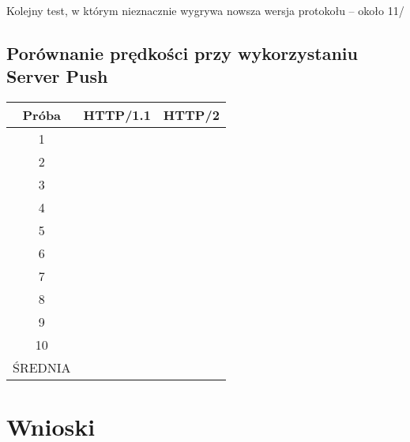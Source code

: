 \documentclass[a4paper,12pt,twoside,openany]{report}
\newcommand{\tech}{\texttt}
\begin{document}
Kolejny test, w którym nieznacznie wygrywa nowsza wersja protokołu -- około 11/%

\section{Porównanie prędkości przy wykorzystaniu Server Push}

\begin{tabular}{c|c|c}
Próba & HTTP/1.1 & HTTP/2 \\ \hline
1 & & \\
2 & & \\
3 & & \\
4 & & \\
5 & & \\
6 & & \\
7 & & \\
8 & & \\
9 & & \\
10 & & \\ \hline
ŚREDNIA & & \\
\end{tabular}


\chapter{Wnioski}


%
%



\begin{thebibliography}{99}
\end{thebibliography}

\end{document}
